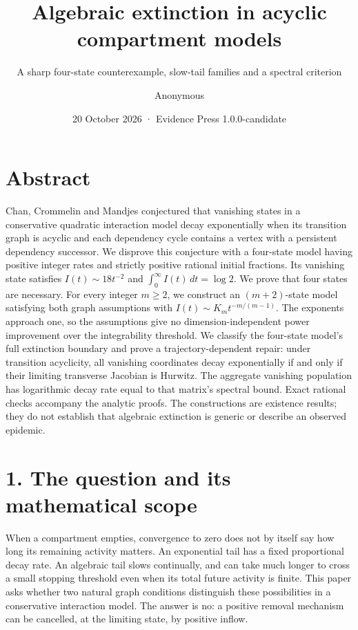 \documentclass[
  11pt,
  a4paper,
]{scrartcl}
\title{Algebraic extinction in acyclic compartment models}
\subtitle{A sharp four-state counterexample, slow-tail families and a
spectral criterion}
\author{Anonymous}
\date{20 October 2026 · Evidence Press 1.0.0-candidate}
\begin{document}
\maketitle

\section{Abstract}\label{abstract}

Chan, Crommelin and Mandjes conjectured that vanishing states in a
conservative quadratic interaction model decay exponentially when its
transition graph is acyclic and each dependency cycle contains a vertex
with a persistent dependency successor. We disprove this conjecture with
a four-state model having positive integer rates and strictly positive
rational initial fractions. Its vanishing state satisfies
\(I(t)\sim18t^{-2}\) and \(\int_0^\infty I(t)\,dt=\log2\). We prove that
four states are necessary. For every integer \(m\ge2\), we construct an
\((m+2)\)-state model satisfying both graph assumptions with
\(I(t)\sim K_m t^{-m/(m-1)}\). The exponents approach one, so the
assumptions give no dimension-independent power improvement over the
integrability threshold. We classify the four-state model's full
extinction boundary and prove a trajectory-dependent repair: under
transition acyclicity, all vanishing coordinates decay exponentially if
and only if their limiting transverse Jacobian is Hurwitz. The aggregate
vanishing population has logarithmic decay rate equal to that matrix's
spectral bound. Exact rational checks accompany the analytic proofs. The
constructions are existence results; they do not establish that
algebraic extinction is generic or describe an observed epidemic.

\section{1. The question and its mathematical
scope}\label{the-question-and-its-mathematical-scope}

When a compartment empties, convergence to zero does not by itself say
how long its remaining activity matters. An exponential tail has a fixed
proportional decay rate. An algebraic tail slows continually, and can
take much longer to cross a small stopping threshold even when its total
future activity is finite. This paper asks whether two natural graph
conditions distinguish these possibilities in a conservative interaction
model. The answer is no: a positive removal mechanism can be cancelled,
at the limiting state, by positive inflow.
\end{document}
